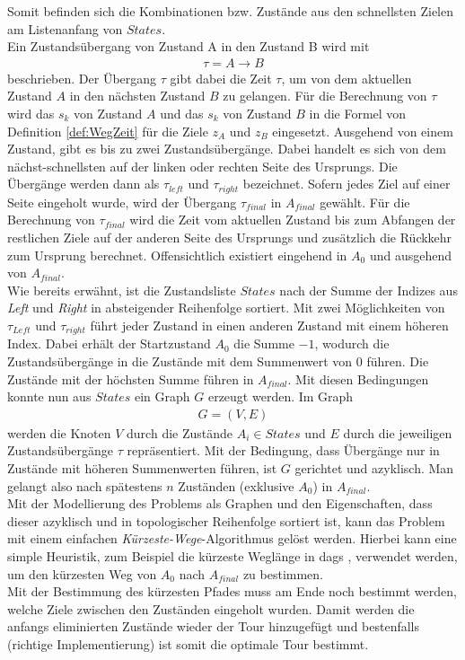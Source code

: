 \documentclass[german,version-2019-11]{uzl-thesis}
\begin{document}
Somit befinden sich die Kombinationen bzw. Zustände aus den schnellsten Zielen am Listenanfang von $States$.\\
Ein Zustandsübergang von Zustand A in den Zustand B wird mit
\begin{align*}
\tau = A\rightarrow B
\end{align*}
beschrieben. Der Übergang $\tau$ gibt dabei die Zeit $\tau$, um von dem aktuellen Zustand $A$ in den nächsten Zustand $B$ zu gelangen. Für die Berechnung von $\tau$ wird das $s_k$ von Zustand $A$ und das $s_k$ von Zustand $B$ in die Formel von Definition \ref{def:WegZeit} für die Ziele $z_A$ und $z_B$ eingesetzt. Ausgehend von einem Zustand, gibt es bis zu zwei Zustandsübergänge. Dabei handelt es sich von dem nächst-schnellsten auf der linken oder rechten Seite des Ursprungs. Die Übergänge werden dann als $\tau_{left}$ und $\tau_{right}$ bezeichnet. Sofern jedes Ziel auf einer Seite eingeholt wurde, wird der Übergang $\tau_{final}$ in $A_{final}$ gewählt. Für die Berechnung von $\tau_{final}$ wird die Zeit vom aktuellen Zustand bis zum Abfangen der restlichen Ziele auf der anderen Seite des Ursprungs und zusätzlich die Rückkehr zum Ursprung berechnet. Offensichtlich existiert eingehend in $A_0$ und ausgehend von $A_{final}$. \\
Wie bereits erwähnt, ist die Zustandsliste $States$ nach der Summe der Indizes aus \emph{Left} und \emph{Right} in absteigender Reihenfolge sortiert. Mit zwei Möglichkeiten von $\tau_{Left}$ und $\tau_{right}$ führt jeder Zustand in einen anderen Zustand mit einem höheren Index. Dabei erhält der Startzustand $A_0$ die Summe $-1$, wodurch die Zustandsübergänge in die Zustände mit dem Summenwert von $0$ führen. Die Zustände mit der höchsten Summe führen in $A_{final}$. Mit diesen Bedingungen konnte nun aus $States$ ein Graph $G$ erzeugt werden. Im Graph
\begin{align*}
G = (V,E)
\end{align*}
werden die Knoten $V$ durch die Zustände $A_i \in States$ und $E$ durch die jeweiligen Zustandsübergänge $\tau$ repräsentiert. Mit der Bedingung, dass Übergänge nur in Zustände mit höheren Summenwerten führen, ist $G$ gerichtet und azyklisch. Man gelangt also nach spätestens $n$ Zuständen (exklusive $A_0$) in $A_{final}$. \\
Mit der Modellierung des Problems als Graphen und den Eigenschaften, dass dieser azyklisch und in topologischer Reihenfolge sortiert ist, kann das Problem mit einem einfachen \emph{Kürzeste-Wege}-Algorithmus gelöst werden. Hierbei kann eine simple Heuristik, zum Beispiel die kürzeste Weglänge in dags \cite{brandstadt1994kurzeste}, verwendet werden, um den kürzesten Weg von $A_0$ nach $A_{final}$ zu bestimmen.\\
Mit der Bestimmung des kürzesten Pfades muss am Ende noch bestimmt werden, welche Ziele zwischen den Zuständen eingeholt wurden. Damit werden die anfangs eliminierten Zustände wieder der Tour hinzugefügt und bestenfalls (richtige Implementierung) ist somit die optimale Tour bestimmt. 
\end{document}
